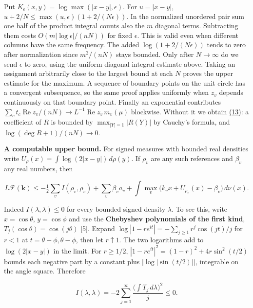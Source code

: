 \documentclass[11pt,a4paper]{article}
\begin{document}
Put \(K_\epsilon(x,y)=\log\max(|x-y|,\epsilon)\). For \(u=|x-y|\), \(u+2/N\le\max(u,\epsilon)(1+2/(N\epsilon))\). In the normalized unordered pair sum one half of the product integral counts also the \(m\) diagonal terms. Subtracting them costs \(O(m|\log\epsilon|/(nN))\) for fixed \(\epsilon\). This is valid even when different columns have the same frequency. The added \(\log(1+2/(N\epsilon))\) tends to zero after normalization since \(m^2/(nN)\) stays bounded. Only after \(N\to\infty\) do we send \(\epsilon\) to zero, using the uniform diagonal integral estimate above. Taking an assignment arbitrarily close to the largest bound at each \(N\) proves the upper estimate for the maximum. A sequence of boundary points on the unit circle has a convergent subsequence, so the same proof applies uniformly when \(z_v\) depends continuously on that boundary point. Finally an exponential contributes \(\sum_c t_c\operatorname{Re}z_v/(nN)\to L^{-1}\operatorname{Re}z_v\,m_v(\mu)\) blockwise. Without it we obtain \hyperref[eq:13]{(13)}: a coefficient of \(R\) is bounded by \(\max_{|Y|=1}|R(Y)|\) by Cauchy's formula, and \(\log(\deg R+1)/(nN)\to0\).

\textbf{A computable upper bound.} For signed measures with bounded real densities write \(U_\rho(x)=\int\log(2|x-y|)\,d\rho(y)\). If \(\rho_v\) are any such references and \(\beta_v\) any real numbers, then

\[
 L\mathcal F(\mathbf k)\le
 -\tfrac12\sum_v I(\rho_v,\rho_v)+\sum_v\beta_va_v+
 \int\max_v\big(k_vx+U_{\rho_v}(x)-\beta_v\big)\,d\nu(x).                \tag{15}\label{eq:15}
\]

Indeed \(I(\lambda,\lambda)\le0\) for every bounded signed density \(\lambda\). To see this, write \(x=\cos\theta\), \(y=\cos\phi\) and use the \textbf{Chebyshev polynomials of the first kind}, \(T_j(\cos\theta)=\cos(j\theta)\) {[}5{]}. Expand \(\log|1-re^{it}|=-\sum_{j\ge1}r^j\cos(jt)/j\) for \(r<1\) at \(t=\theta+\phi,\theta-\phi\), then let \(r\uparrow1\). The two logarithms add to \(\log(2|x-y|)\) in the limit. For \(r\ge1/2\), \(|1-re^{it}|^2=(1-r)^2+4r\sin^2(t/2)\) bounds each negative part by a constant plus \(|\log|\sin(t/2)||\), integrable on the angle square. Therefore

\[
 I(\lambda,\lambda)=-2\sum_{j=1}^{\infty}
            \frac{\big(\int T_j\,d\lambda\big)^2}{j}\le0 .
\]
\end{document}
